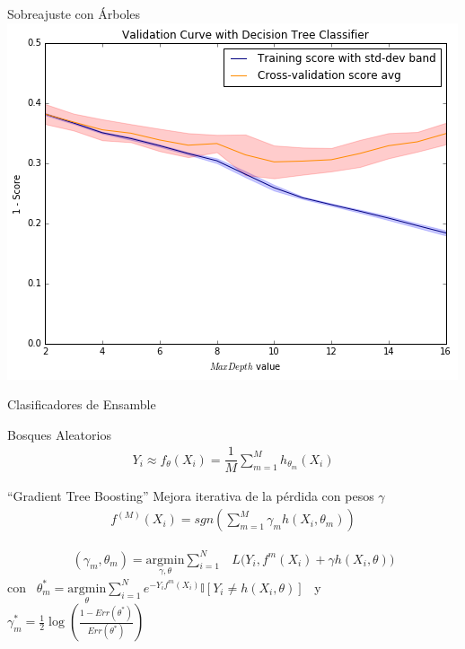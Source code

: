 \documentclass[xcolor=x11names]{beamer}
\begin{document}

\begin{frame}{Sobreajuste con Árboles }
\center\
\includegraphics[width=1\textheight]{figure-biasVariance/dtree_overfit_problem_2.png}
\end{frame}


\begingroup
\footnotesize%
\begin{frame}{Clasificadores de Ensamble }

	\begin{block}{Bosques Aleatorios}
		\begin{align*}
			Y_i \approx f_{\theta}(X_i) = \dfrac{1}{M}\sum_{m=1}^M h_{\theta_m}(X_i)
		\end{align*}

	\end{block}

	\begin{block}{``Gradient Tree Boosting''}
		Mejora iterativa de la pérdida con pesos $\gamma$
		\begin{align*}
			f^{(M)}(X_i) = sgn \left(\sum_{m=1}^{M} \gamma_m h(X_i,\theta_m) \right)
		\end{align*}

		\begin{align*}
				(\gamma_{m}, \theta_{m}) = \underset{\gamma, \theta}{\mathrm{argmin}} \sum_{i=1}^{N} & L\big( Y_i,  f^{m}(X_i) + \gamma h(X_i,\theta) \big)
		\end{align*}
		con \  $\theta^*_{m} = \underset{ \theta}{\mathrm{argmin}} \sum_{i=1}^{N}e^{-Y_i f^{m}(X_i)}
		\mathbb{I}\left[ Y_i \neq h(X_i,\theta)  \right]$ \ y \
		$\gamma^*_{m} = \frac{1}{2} \log\left( \frac{1 - Err(\theta^*) }{ Err(\theta^*) } \right)$

	\end{block}


\end{frame}
\endgroup
\end{document}
